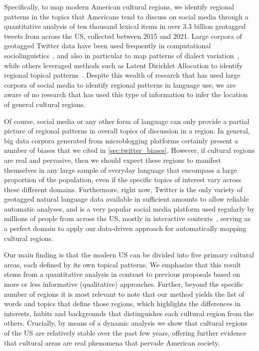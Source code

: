 \documentclass[../thesis.tex]{subfiles}
\begin{document}
Specifically, to map modern American cultural regions, we identify regional patterns in
the topics that Americans tend to discuss on social media through a quantitative
analysis of ten thousand lexical items in over 3.3 billion geotagged tweets from across
the US, collected between 2015 and 2021. Large corpora of geotagged Twitter data have
been used frequently in computational
sociolinguistics~\cite{NguyenComputationalSociolinguistics2016}, and also in particular
to map patterns of dialect
variation~\cite{GrieveStatisticalMethod2011,EisensteinDiffusionLexical2014,GoncalvesCrowdsourcingDialect2014,HuangUnderstandingRegional2016,GrieveRegionalVariation2016,
DonosoDialectometricAnalysis2017,GoncalvesMappingAmericanization2018,AbitbolSocioeconomicDependencies2018,GrieveMappingLexical2019},
while others leveraged methods such as Latent Dirichlet Allocation to identify regional
topical patterns~\cite{KoyluUncoveringGeoSocial2018,FunknerGeographicalTopic2021}.
Despite this wealth of research that has used large corpora of social media to identify
regional patterns in language use, we are aware of no research that has used this type
of information to infer the location of general cultural regions.

Of course, social media or any other form of language can only provide a partial picture
of regional patterns in overall topics of discussion in a region. In general, big data
corpora generated from microblogging platforms certainly present a number of biases that we cited in \cref{sec:twitter_biases}. However, if cultural regions are real and pervasive, then
we should expect these regions to manifest themselves in any large sample of everyday
language that encompass a large proportion of the population, even if the specific
topics of interest vary across these different domains. Furthermore, right now, Twitter
is the only variety of geotagged natural language data available in sufficient amounts
to allow reliable automatic analyses, and is a very popular social media platform used
regularly by millions of people from across the US, mostly in interactive
contexts~\cite{AuxierSocialMedia2021}, serving as a perfect domain to apply our
data-driven approach for automatically mapping cultural regions.

Our main finding is that the modern US can be divided into five primary cultural areas,
each defined by its own topical patterns. We emphasize that this result stems from a
quantitative analysis in contrast to previous proposals based on more or less
informative (qualitative) approaches. Further, beyond the specific number of regions it
is most relevant to note that our method yields the list of words and topics that define
those regions, which highlights the differences in interests, habits and backgrounds
that distinguishes each cultural region from the others. Crucially, by means of a
dynamic analysis we show that cultural regions of the US are relatively stable over the
past few years, offering further evidence that cultural areas are real phenomena that
pervade American society.
\end{document}
